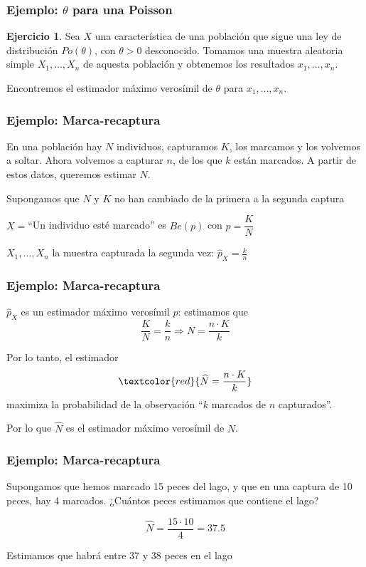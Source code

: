 \documentclass[12pt,t]{beamer}
\newcommand{\red}[1]{\textcolor{red}{#1}}
\renewcommand{\emph}[1]{{\color{red}#1}}
\theoremstyle{plain}
\theoremstyle{definition}
\newtheorem{exerc}{Ejercicio}
\begin{document}
\begin{frame}
\frametitle{Ejemplo: $\theta$ para  una Poisson}

\vspace{1cm}

\begin{exerc}
Sea $X$ una característica de una población que sigue una ley de distribución $Po(\theta)$, con $\theta>0$ desconocido. Tomamos  una muestra aleatoria   simple $X_1,\ldots,X_n$ de aquesta población y obtenemos los resultados $x_1,\ldots,x_n$. 

\medskip

Encontremos el estimador máximo verosímil  de $\theta$ para  $x_1,\ldots,x_n$.
\end{exerc}

\end{frame}



\begin{frame}
\frametitle{Ejemplo: Marca-recaptura}

En una población hay $N$ individuos, capturamos $K$, los marcamos y los  volvemos a soltar.  Ahora volvemos a capturar $n$, de los que   $k$ están marcados. A partir de estos datos, queremos estimar $N$.
\bigskip

Supongamos  que $N$ y $K$ no han cambiado de la primera a la segunda captura
\bigskip

$X=$``Un individuo esté marcado'' es $Be(p)$ con $p=\dfrac{K}{N}$
\bigskip

$X_1,\ldots,X_n$ la muestra capturada la segunda vez: $\widehat{p}_X=\frac{k}{n}$

\end{frame}


\begin{frame}
\frametitle{Ejemplo: Marca-recaptura}

$\widehat{p}_X$ es un estimador máximo verosímil $p$: estimamos que
$$
\dfrac{K}{N}=\dfrac{k}{n}\Rightarrow N=\frac{n\cdot K}{k}
$$

Por lo tanto, el estimador
$$
\red{\widehat{N}=\frac{n\cdot K}{k}}
$$
 maximiza  la probabilidad  de la observación ``$k$ marcados de $n$ capturados''. 

\bigskip

Por lo que $\hat{N}$ es el \emph{estimador máximo verosímil} de $N$.

\end{frame}

\begin{frame}
\frametitle{Ejemplo: Marca-recaptura}

Supongamos que hemos marcado 15 peces del lago, y que en una captura de 10 peces, hay  4 marcados. ¿Cuántos peces estimamos  que contiene el lago?
\medskip

$$
\widehat{N}=\frac{15\cdot 10}{4}=37.5
$$

Estimamos que habrá entre 37 y 38 peces en el  lago

\end{frame}
\end{document}
